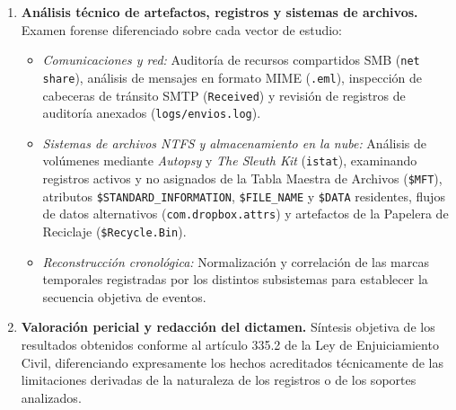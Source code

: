 \begin{enumerate}[leftmargin=1.6em, itemsep=0.65em]
	\item \textbf{Análisis técnico de artefactos, registros y sistemas de archivos.}
	Examen forense diferenciado sobre cada vector de estudio:
	\begin{itemize}[leftmargin=1.4em, itemsep=0.35em]
		\item \textit{Comunicaciones y red:} Auditoría de recursos compartidos SMB (\texttt{net share}), análisis de mensajes en formato MIME (\texttt{.eml}), inspección de cabeceras de tránsito SMTP (\texttt{Received}) y revisión de registros de auditoría anexados (\texttt{logs/envios.log}).
		\item \textit{Sistemas de archivos NTFS y almacenamiento en la nube:} Análisis de volúmenes mediante \textit{Autopsy} y \textit{The Sleuth Kit} (\texttt{istat}), examinando registros activos y no asignados de la Tabla Maestra de Archivos (\texttt{\$MFT}), atributos \texttt{\$STANDARD\_INFORMATION}, \texttt{\$FILE\_NAME} y \texttt{\$DATA} residentes, flujos de datos alternativos (\texttt{com.dropbox.attrs}) y artefactos de la Papelera de Reciclaje (\texttt{\$Recycle.Bin}).
		\item \textit{Reconstrucción cronológica:} Normalización y correlación de las marcas temporales registradas por los distintos subsistemas para establecer la secuencia objetiva de eventos.
	\end{itemize}
	
	\item \textbf{Valoración pericial y redacción del dictamen.}
	Síntesis objetiva de los resultados obtenidos conforme al artículo 335.2 de la Ley de Enjuiciamiento Civil, diferenciando expresamente los hechos acreditados técnicamente de las limitaciones derivadas de la naturaleza de los registros o de los soportes analizados.
\end{enumerate}